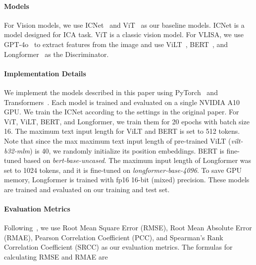 
\paragraph{Models}
For Vision models, we use ICNet~\cite{ic9600} and ViT~\cite{vit} as our baseline models. 
ICNet is a model designed for ICA task. 
ViT is a classic vision model. 
For VLISA, we use GPT-4o~\cite{gpt4} to extract features from the image and use ViLT~\cite{Kim2021ViLTVT}, BERT~\cite{devlin-etal-2019-bert}, and Longformer~\cite{Beltagy2020Longformer} as the Discriminator. 

\paragraph{Implementation Details}
We implement the models described in this paper using PyTorch~\cite{torch} and Transformers~\cite{wolf-etal-2020-transformers}.
Each model is trained and evaluated on a single NVIDIA A10 GPU.
We train the ICNet according to the settings in the original paper.
For ViT, ViLT, BERT, and Longformer, we train them for 20 epochs with batch size 16. 
The maximum text input length for ViLT and BERT is set to 512 tokens.
Note that since the max maximum text input length of pre-trained ViLT (\textit{vilt-b32-mlm}) is 40, we randomly initialize its position embeddings.
BERT is fine-tuned based on \textit{bert-base-uncased}.
The maximum input length of Longformer was set to 1024 tokens, and it is fine-tuned on \textit{longformer-base-4096}.
To save GPU memory, Longformer is trained with fp16 16-bit (mixed) precision.
These models are trained and evaluated on our training and test set. 



\paragraph{Evaluation Metrics}

Following~\citet{ic9600}, we use Root Mean Square Error (RMSE), Root Mean Absolute Error (RMAE), Pearson Correlation Coefficient (PCC), and Spearman's Rank Correlation Coefficient (SRCC) as our evaluation metrics.
The formulas for calculating RMSE and RMAE are

